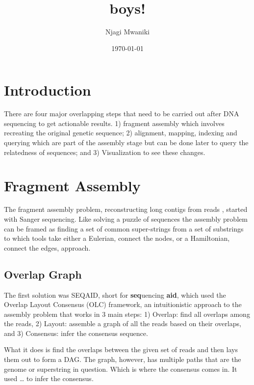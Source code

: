 \documentclass[11pt]{article}
\author{Njagi Mwaniki}
\date{\today}
\title{boys!}
\begin{document}
\maketitle
\tableofcontents


\section{Introduction}
\label{sec:org5691c01}

There are four major overlapping steps that need to be carried out after DNA 
sequencing to get actionable results. 1) fragment assembly which involves 
recreating the original genetic sequence; 2) alignment, mapping, indexing and 
querying which are part of the assembly stage but can be done later to query the
relatedness of sequences; and 3) Visualization to see these changes.\cite{flicekSenseSequenceReads2009}

\section{Fragment Assembly}
\label{sec:org33aabd8}
The fragment assembly problem, reconstructing long contigs from reads
\cite{chikhiCompactingBruijnGraphs2016}, started with Sanger sequencing.
Like solving a puzzle of sequences the assembly problem can be framed as finding
a set of common super-strings from a set of substrings to which tools take 
either a Eulerian, connect the nodes, or a Hamiltonian, connect the edges, 
approach.

\subsection{Overlap Graph}
\label{sec:orgf18109d}
The first solution was SEQAID, short for \textbf{seq}uencing \textbf{aid},
\cite{peltolaSEQAIDDNASequence1984} which used the  Overlap Layout Consensus (OLC)
framework, an intuitionistic approach to the assembly problem that works in  
3 main steps: 1) Overlap: find all overlaps among the reads, 2) Layout: assemble
a graph of all the reads based on their overlaps, and 3) Consensus: infer the
consensus sequence.

What it does is find the overlaps between the given set of reads and then lays 
them out to form a DAG. The graph, however, has multiple paths that are the 
genome or superstring in question. Which is where the consensus comes in. 
It used … to infer the consensus.
\end{document}
